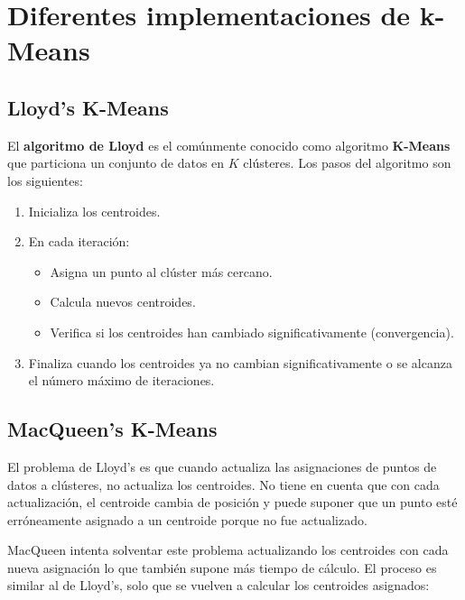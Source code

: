 \chapter{Diferentes implementaciones de k-Means}

\section{Lloyd's K-Means}
El \textbf{algoritmo de Lloyd} es el comúnmente conocido como algoritmo \textbf{K-Means} que particiona un conjunto de datos en $K$ clústeres. Los pasos del algoritmo son los siguientes:

\begin{enumerate}
    \item Inicializa los centroides.
    \item En cada iteración:
    \begin{itemize}
        \item Asigna un punto al clúster más cercano.
        \item Calcula nuevos centroides.
        \item Verifica si los centroides han cambiado significativamente (convergencia).
    \end{itemize}

    \item Finaliza cuando los centroides ya no cambian significativamente o se alcanza el número máximo de iteraciones.

    
\end{enumerate}



\section{MacQueen's K-Means}
El problema de Lloyd's es que cuando actualiza las asignaciones de puntos de datos a clústeres, no actualiza los centroides. No tiene en cuenta que con cada actualización, el centroide cambia de posición y puede suponer que un punto esté erróneamente asignado a un centroide porque no fue actualizado.

MacQueen intenta solventar este problema actualizando los centroides con cada nueva asignación lo que también supone más tiempo de cálculo. El proceso es similar al de Lloyd's, solo que se vuelven a calcular los centroides asignados:

